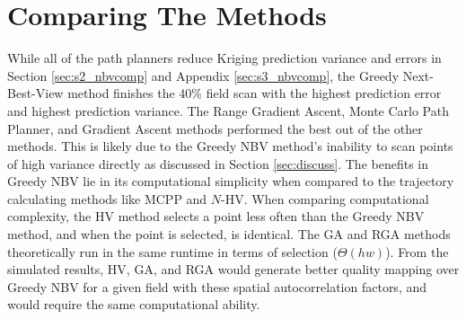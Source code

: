 \section{Comparing The Methods}
While all of the path planners reduce Kriging prediction variance and errors in Section \ref{sec:s2_nbvcomp} and Appendix \ref{sec:s3_nbvcomp}, the Greedy Next-Best-View method finishes the $40\%$ field scan with the highest prediction error and highest prediction variance. The Range Gradient Ascent, Monte Carlo Path Planner, and Gradient Ascent methods performed the best out of the other methods. This is likely due to the Greedy NBV method's inability to scan points of high variance directly as discussed in Section \ref{sec:discuss}. The benefits in Greedy NBV lie in its computational simplicity when compared to the trajectory calculating methods like MCPP and $N$-HV. When comparing computational complexity, the HV method selects a point less often than the Greedy NBV method, and when the point is selected, is identical. The GA and RGA methods theoretically run in the same runtime in terms of selection ($\Theta(hw)$). From the simulated results, HV, GA, and RGA would generate better quality mapping over Greedy NBV for a given field with these spatial autocorrelation factors, and would require the same computational ability. 

